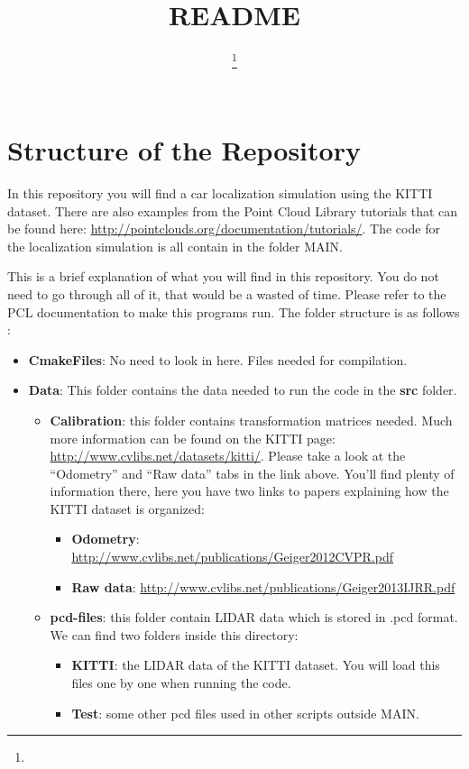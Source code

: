 \documentclass[twoside]{article}
\title{\vspace{-15mm}\fontsize{24pt}{10pt}\selectfont\textbf{README}} %
\author{
\large
\textsc{}\thanks{}\\[2mm] %
\normalsize  \\ %
\normalsize \href{mailto:}{} %
\vspace{-5mm}
}
\date{}
\begin{document}
\section{Structure of the Repository}

In this repository you will find a car localization simulation using the KITTI dataset. There are also examples from the Point Cloud Library tutorials that can be found here: \url{http://pointclouds.org/documentation/tutorials/}. The code for the localization simulation is all contain in the folder MAIN.

This is a brief explanation of what you will find in this repository. You do not need to go through all of it, that would be a wasted of time. Please refer to the PCL documentation to make this programs run. The folder structure is as follows :
\begin{itemize}

\item \textbf{CmakeFiles}: No need to look in here. Files needed for compilation.
\item \textbf{Data}: This folder contains the data needed to run the code in the \textbf{src} folder.

\begin{itemize}
	\item  \textbf{Calibration}: this folder contains transformation matrices needed. Much more information can be found on the KITTI page: \url{http://www.cvlibs.net/datasets/kitti/}. Please take a look at the “Odometry” and “Raw data” tabs in the link above. You'll find plenty of information there, here you have two links to papers explaining how the KITTI dataset is organized:
	\begin{itemize}
		\item \textbf{Odometry}: \url{http://www.cvlibs.net/publications/Geiger2012CVPR.pdf}
		\item \textbf{Raw data}: \url{http://www.cvlibs.net/publications/Geiger2013IJRR.pdf}
	\end{itemize}
	\item \textbf{pcd-files}: this folder contain LIDAR data which is stored in .pcd format. We can find two folders inside this directory:
	\begin{itemize}
		\item \textbf{KITTI}: the LIDAR data of the KITTI dataset. You will load this files one by one when running the code.
		\item \textbf{Test}: some other pcd files used in other scripts outside MAIN.
	\end{itemize}


\end{itemize}
\end{itemize}
\end{document}
